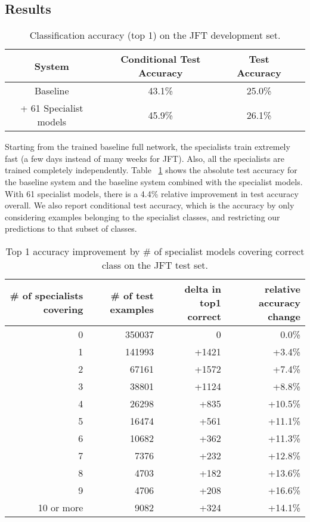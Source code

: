 \subsection{Results}

\begin{table}
\centering
\small
\begin{tabular}{|c|c|c|c|}
\hline
System & Conditional Test Accuracy & Test Accuracy \\
\hline
Baseline & 43.1\% & 25.0\%\\
 + 61 Specialist models & 45.9\%& 26.1\% \\
\hline
\end{tabular}
\caption{Classification accuracy (top 1) on the JFT development set.}\label{tab:image_results_spec}
\end{table}

Starting from the trained baseline full network,
the specialists train extremely fast (a few days instead of many weeks for JFT). Also, all the specialists
are trained completely independently.  Table ~\ref{tab:image_results_spec} shows the absolute test accuracy for the
baseline system and the baseline system combined with the specialist
models.  With 61 specialist models, there is a
4.4\% relative improvement in test accuracy overall. We also report conditional test accuracy, which is the accuracy by only considering examples belonging to the specialist classes, and restricting our predictions to that subset of classes.



\begin{table}
\centering
\small
\begin{tabular}{|r|r|r|r|}
\hline
\# of specialists covering & \# of test examples & delta in top1 correct &
relative accuracy change \\
\hline
  0 &  350037 &      0 & 0.0\% \\
  1 &  141993 &  +1421 & +3.4\% \\
  2 &   67161 &  +1572 & +7.4\% \\
  3 &   38801 &  +1124 & +8.8\% \\
  4 &   26298 &   +835 & +10.5\% \\
  5 &   16474 &   +561 & +11.1\% \\
  6 &   10682 &   +362 & +11.3\% \\
  7 &    7376 &   +232 & +12.8\% \\
  8 &    4703 &   +182 & +13.6\% \\
  9 &    4706 &   +208 & +16.6\% \\
 10 or more &    9082 &   +324 & +14.1\% \\
\hline
\end{tabular}
\caption{Top 1 accuracy improvement by \# of specialist models covering
correct class on the JFT test set.}\label{tab:jft_specialists_histogram}
\end{table}

